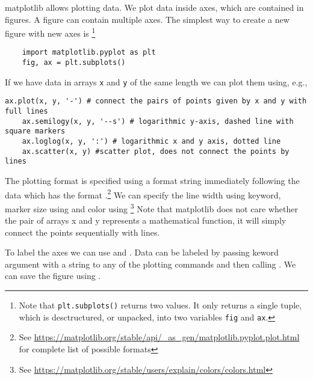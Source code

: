 matplotlib allows plotting data. We plot data inside axes, which are contained in figures. A figure can contain multiple axes. The simplest way to create a new figure with new axes is \footnote{Note that \lstinline{plt.subplots()} returns two values. It only returns a single tuple, which is desctructured, or unpacked, into two variables \lstinline{fig} and \lstinline{ax}.}
\begin{lstlisting}
    import matplotlib.pyplot as plt
    fig, ax = plt.subplots()
\end{lstlisting}
If we have data in arrays \lstinline{x} and \lstinline{y} of the same length we can plot them using, e.g., 
\begin{lstlisting}[caption=Basic plotting.]
    ax.plot(x, y, '-') # connect the pairs of points given by x and y with full lines
    ax.semilogy(x, y, '--s') # logarithmic y-axis, dashed line with square markers
    ax.loglog(x, y, ':') # logarithmic x and y axis, dotted line
    ax.scatter(x, y) #scatter plot, does not connect the points by lines
\end{lstlisting}
The plotting format is specified using a format string immediately following the data which has the format .\footnote{See \url{https://matplotlib.org/stable/api/_as_gen/matplotlib.pyplot.plot.html} for complete list of possible formats} We can specify the line width using  keyword, marker size using  and color using  \footnote{See \url{https://matplotlib.org/stable/users/explain/colors/colors.html}} Note that matplotlib does not care whether the pair of arrays x and y represents a mathematical function, it will simply connect the points sequentially with lines.

To label the axes we can use  and . Data can be labeled by passing  keword argument with a string to any of the plotting commands and then calling . We can save the figure using .

